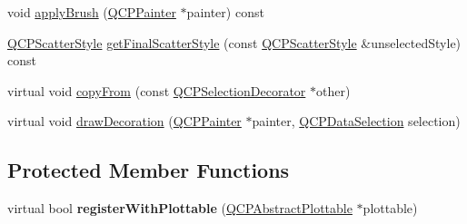 \begin{DoxyCompactItemize}
\item 
void \hyperlink{class_q_c_p_selection_decorator_a225544527d51b49546b70d0e6d655a34}{apply\+Brush} (\hyperlink{class_q_c_p_painter}{Q\+C\+P\+Painter} $\ast$painter) const
\item 
\hyperlink{class_q_c_p_scatter_style}{Q\+C\+P\+Scatter\+Style} \hyperlink{class_q_c_p_selection_decorator_a1277b373248896bc70e8cc1de96da9fa}{get\+Final\+Scatter\+Style} (const \hyperlink{class_q_c_p_scatter_style}{Q\+C\+P\+Scatter\+Style} \&unselected\+Style) const
\item 
virtual void \hyperlink{class_q_c_p_selection_decorator_a467a8d5cfcab27e862a17c797ac27b8a}{copy\+From} (const \hyperlink{class_q_c_p_selection_decorator}{Q\+C\+P\+Selection\+Decorator} $\ast$other)
\item 
virtual void \hyperlink{class_q_c_p_selection_decorator_a4f8eb49e277063845391e803ae23054a}{draw\+Decoration} (\hyperlink{class_q_c_p_painter}{Q\+C\+P\+Painter} $\ast$painter, \hyperlink{class_q_c_p_data_selection}{Q\+C\+P\+Data\+Selection} selection)
\end{DoxyCompactItemize}
\subsection*{Protected Member Functions}
\begin{DoxyCompactItemize}
\item 
\mbox{\label{class_q_c_p_selection_decorator_af66cb39e308da0285ae5d533e1e85027}} 
virtual bool {\bfseries register\+With\+Plottable} (\hyperlink{class_q_c_p_abstract_plottable}{Q\+C\+P\+Abstract\+Plottable} $\ast$plottable)
\end{DoxyCompactItemize}
